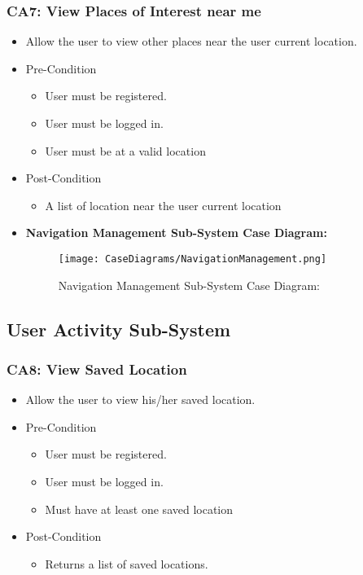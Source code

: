 \documentclass[12pt,a4paper]{article}
\begin{document}
		\subsubsection{CA7: View Places of Interest near me}
			\begin{itemize}
				\item Allow the user to view other places near the user current location.
				\item Pre-Condition
					\begin{itemize}
						\item User must be registered.
						\item User must be logged in.
						\item User must be at a valid location
					\end{itemize}
				\item Post-Condition
					\begin{itemize}
						\item A list of location near the user current location
					\end{itemize}
				\item \textbf{Navigation Management Sub-System Case Diagram:}
				\begin{figure}[H]
					\texttt{[image: CaseDiagrams/NavigationManagement.png]}
					\caption{Navigation Management Sub-System Case Diagram:}
				\end{figure}
			\end{itemize}
	\subsection{User Activity Sub-System}
		\subsubsection{CA8: View Saved Location}
			\begin{itemize}
				\item Allow the user to view his/her saved location.
				\item Pre-Condition
					\begin{itemize}
						\item User must be registered.
						\item User must be logged in.
						\item Must have at least one saved location
					\end{itemize}
				\item Post-Condition
					\begin{itemize}
						\item Returns a list of saved locations.
					\end{itemize}
			\end{itemize}
\end{document}
